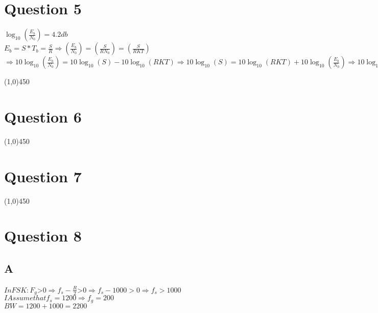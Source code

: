 \documentclass[a4paper,12pt]{book}
\begin{document}
\section {Question 5 }
\begin{doublespace}
$\log_{10}{(\frac{E_b}{N_0})} = 4.2 db$\\
$E_b = S * T_b = \frac{S}{R} \Longrightarrow (\frac{E_b}{N_0}) = (\frac{S}{R N_0}) =( \frac{S}{RKT})$\\
$\Longrightarrow 10 \log_{10}{(\frac{E_b}{N_0})} = 10 \log_{10}{(S)} - 10 \log_{10}{(RKT)} \Longrightarrow 10 \log_{10}{(S)} = 10 \log_{10}{(RKT)} + 10 \log_{10}{(\frac{E_b}{N_0})} \Longrightarrow 10 \log_{10}{(S)} = 10 \log_{10}{(RKT)} + 4.2 \Longrightarrow 10 \log_{10}{(S)} = 10 \log_{10}{(270 * 3600 * 1.38 * 10^{-23})} + 4.2  \Longrightarrow  10 \log_{10}{(S)} = -164.67 \Longrightarrow  \log_{10}{(S)} = -16.467 \Longrightarrow S = 10^{-16.46} \approx 10^{-16}$
\end{doublespace}
\line(1,0){450}


\section {Question 6 }
\begin{doublespace}
\end{doublespace}
\line(1,0){450}


\section {Question 7 }
\begin{doublespace}
\end{doublespace}
\line(1,0){450}


\section {Question 8 }

\subsection{A}
\begin{doublespace}
$In FSK : F_g $>$  0 \Longrightarrow f_s - \frac{R}{2}  $>$  0 \Longrightarrow  f_s - 1000 > 0 \Longrightarrow f_s > 1000 $ \\
$I Assume that f_s = 1200 \Longrightarrow f_g = 200$ \\
$BW = 1200 + 1000 = 2200$\\
\end{doublespace}
\end{document}
